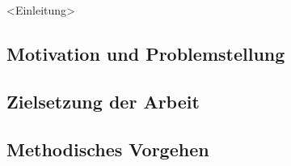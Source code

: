 <Einleitung>
\subsection{Motivation und Problemstellung}

\subsection{Zielsetzung der Arbeit}

\subsection{Methodisches Vorgehen}
